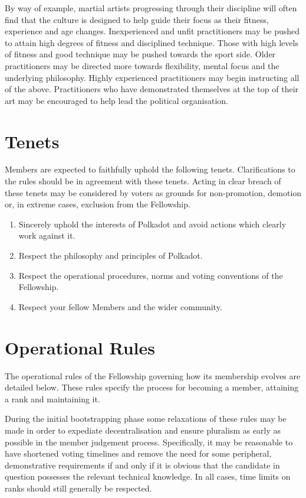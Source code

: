 \documentclass[9pt,oneside]{amsart}
\begin{document}
By way of example, martial artists progressing through their discipline will often find that the culture is designed to help guide their focus as their fitness, experience and age changes. Inexperienced and unfit practitioners may be pushed to attain high degrees of fitness and disciplined technique. Those with high levels of fitness and good technique may be pushed towards the sport side. Older practitioners may be directed more towards flexibility, mental focus and the underlying philosophy. Highly experienced practitioners may begin instructing all of the above. Practitioners who have demonstrated themselves at the top of their art may be encouraged to help lead the political organisation.

\section{Tenets}

Members are expected to faithfully uphold the following tenets. Clarifications to the rules should be in agreement with these tenets. Acting in clear breach of these tenets may be considered by voters as grounds for non-promotion, demotion or, in extreme cases, exclusion from the Fellowship.

\begin{enumerate}
\item Sincerely uphold the interests of Polkadot and avoid actions which clearly work against it.
\item Respect the philosophy and principles of Polkadot.
\item Respect the operational procedures, norms and voting conventions of the Fellowship.
\item Respect your fellow Members and the wider community.
\end{enumerate}

\section{Operational Rules}\label{operational-rules}

The operational rules of the Fellowship governing how its membership evolves are detailed below. These rules specify the process for becoming a member, attaining a rank and maintaining it.

During the initial bootstrapping phase some relaxations of these rules may be made in order to expediate decentralisation and ensure pluralism as early as possible in the member judgement process. Specifically, it may be reasonable to have shortened voting timelines and remove the need for some peripheral, demonstrative requirements if and only if it is obvious that the candidate in question possesses the relevant technical knowledge. In all cases, time limits on ranks should still generally be respected.
\end{document}
